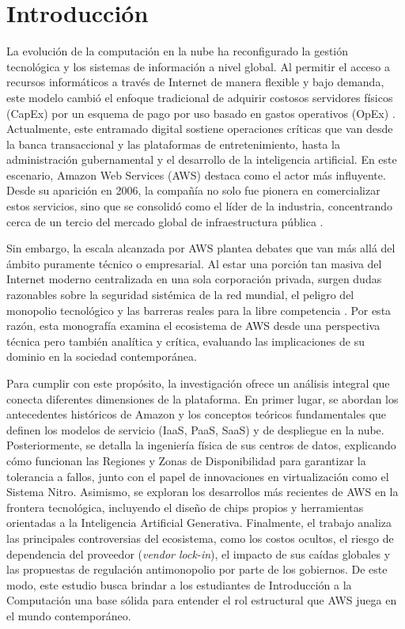 \documentclass[12pt,a4paper]{article}
\begin{document}
\tableofcontents
\newpage


\section{Introducción}
La evolución de la computación en la nube ha reconfigurado la gestión tecnológica y los sistemas de información a nivel global. Al permitir el acceso a recursos informáticos a través de Internet de manera flexible y bajo demanda, este modelo cambió el enfoque tradicional de adquirir costosos servidores físicos (CapEx) por un esquema de pago por uso basado en gastos operativos (OpEx) \parencite{mell2011}. Actualmente, este entramado digital sostiene operaciones críticas que van desde la banca transaccional y las plataformas de entretenimiento, hasta la administración gubernamental y el desarrollo de la inteligencia artificial. En este escenario, Amazon Web Services (AWS) destaca como el actor más influyente. Desde su aparición en 2006, la compañía no solo fue pionera en comercializar estos servicios, sino que se consolidó como el líder de la industria, concentrando cerca de un tercio del mercado global de infraestructura pública \parencite{gartner2024, statista2025}.

Sin embargo, la escala alcanzada por AWS plantea debates que van más allá del ámbito puramente técnico o empresarial. Al estar una porción tan masiva del Internet moderno centralizada en una sola corporación privada, surgen dudas razonables sobre la seguridad sistémica de la red mundial, el peligro del monopolio tecnológico y las barreras reales para la libre competencia \parencite{armbrust2010}. Por esta razón, esta monografía examina el ecosistema de AWS desde una perspectiva técnica pero también analítica y crítica, evaluando las implicaciones de su dominio en la sociedad contemporánea.

Para cumplir con este propósito, la investigación ofrece un análisis integral que conecta diferentes dimensiones de la plataforma. En primer lugar, se abordan los antecedentes históricos de Amazon y los conceptos teóricos fundamentales que definen los modelos de servicio (IaaS, PaaS, SaaS) y de despliegue en la nube. Posteriormente, se detalla la ingeniería física de sus centros de datos, explicando cómo funcionan las Regiones y Zonas de Disponibilidad para garantizar la tolerancia a fallos, junto con el papel de innovaciones en virtualización como el Sistema Nitro. Asimismo, se exploran los desarrollos más recientes de AWS en la frontera tecnológica, incluyendo el diseño de chips propios y herramientas orientadas a la Inteligencia Artificial Generativa. Finalmente, el trabajo analiza las principales controversias del ecosistema, como los costos ocultos, el riesgo de dependencia del proveedor (\textit{vendor lock-in}), el impacto de sus caídas globales y las propuestas de regulación antimonopolio por parte de los gobiernos. De este modo, este estudio busca brindar a los estudiantes de Introducción a la Computación una base sólida para entender el rol estructural que AWS juega en el mundo contemporáneo.
\newpage
\end{document}
